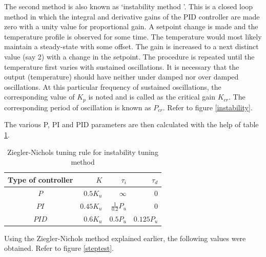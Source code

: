 The second method is also known as \textquoteleft instability method \textquoteright \cite{kmm09}. This is a closed 
loop method in which the integral and derivative gains of the PID controller are made zero with a unity value for 
proportional gain. A setpoint change is made and the temperature profile is observed for some time. The temperature 
would most likely maintain a steady-state with some offset. The gain is increased to a next distinct value (say 2) 
with a change in the setpoint. The procedure is repeated until the temperature first varies with sustained oscillations. 
It is necessary that the output (temperature) should have neither under damped nor over damped oscillations. At this 
particular frequency of sustained oscillations, the corresponding value of $K_p$ is noted and is called as the critical
gain $K_{cr}$. The corresponding period of oscillation is known as  $P_{cr}$. Refer to figure \ref{instability}.

The various P, PI and PID parameters are then calculated with the help of table \ref{2ndmtd}.
\begin{table}
\begin{center}
\renewcommand{\arraystretch}{1.5}
\begin{tabular}{|c|r|r|r|}\hline
Type of
controller & $K$ & $\tau_i$ & $\tau_d$ \\ \hline
$P$ & $0.5K_{u}$ & $\infty$ & 0 \\ \hline
$PI$ & $0.45K_{u}$ & $\frac{1}{0.2}P_{u}$ & 0 \\\hline
$PID$ & $0.6K_{u}$ & $0.5P_{u}$ & $0.125P_{u}$ \\ \hline
\end{tabular}
\caption{Ziegler-Nichols tuning rule for instability tuning method}
\label{2ndmtd}
\end{center}
\end{table}
Using the Ziegler-Nichols method explained earlier, the following values were obtained. Refer to figure \ref{steptest}.

